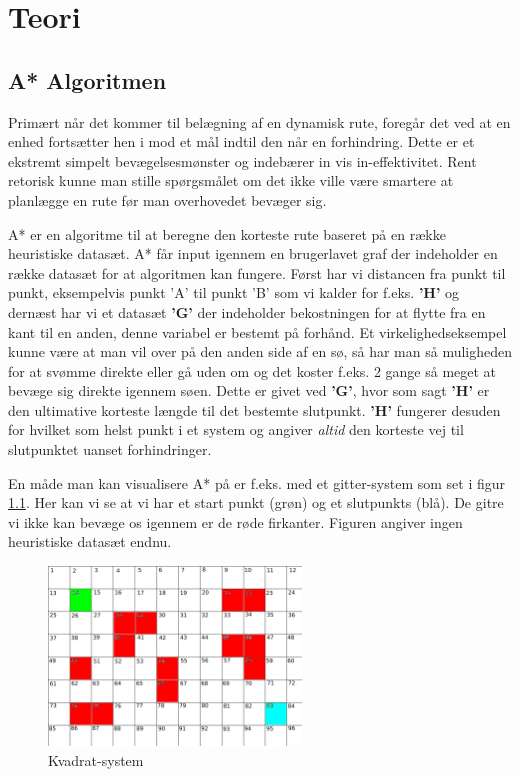 \chapter{Teori}\label{Teori}

\section{A* Algoritmen}\label{A-Algoritmen}
Primært når det kommer til belægning af en dynamisk rute, foregår det ved at en enhed fortsætter hen i mod et mål indtil den når en forhindring. Dette er et ekstremt simpelt bevægelsesmønster og indebærer in vis in-effektivitet. Rent retorisk kunne man stille spørgsmålet om det ikke ville være smartere at planlægge en rute før man overhovedet bevæger sig.

A* er en algoritme til at beregne den korteste rute baseret på en række heuristiske datasæt. A* får input igennem en brugerlavet graf der indeholder en række datasæt for at algoritmen kan fungere.  Først har vi distancen fra punkt til punkt, eksempelvis punkt 'A' til punkt 'B' som vi kalder for f.eks. \textbf{'H'} og dernæst har vi et datasæt \textbf{'G'} der indeholder bekostningen for at flytte fra en kant til en anden, denne variabel er bestemt på forhånd. Et virkelighedseksempel kunne være at man vil over på den anden side af en sø, så har man så muligheden for at svømme direkte eller gå uden om og det koster f.eks. 2 gange så meget at bevæge sig direkte igennem søen. Dette er givet ved \textbf{'G'}, hvor som sagt \textbf{'H'} er den ultimative korteste længde til det bestemte slutpunkt. \textbf{'H'} fungerer desuden for hvilket som helst punkt i et system og angiver \textit{altid} den korteste vej til slutpunktet uanset forhindringer.

En måde man kan visualisere A* på er f.eks. med et gitter-system som set i figur \ref{A*Kvadrat-1}. Her kan vi se at vi har et start punkt (grøn) og et slutpunkts (blå). De gitre vi ikke kan bevæge os igennem er de røde firkanter. Figuren angiver ingen heuristiske datasæt endnu.

\begin{figure}
    \centering
    \includegraphics[width=0.60\textwidth]{Pictures/Teoriafsnit/Figurfiler/Grid2.png}
    \caption{Kvadrat-system}
    \label{A*Kvadrat-1}
\end{figure}

